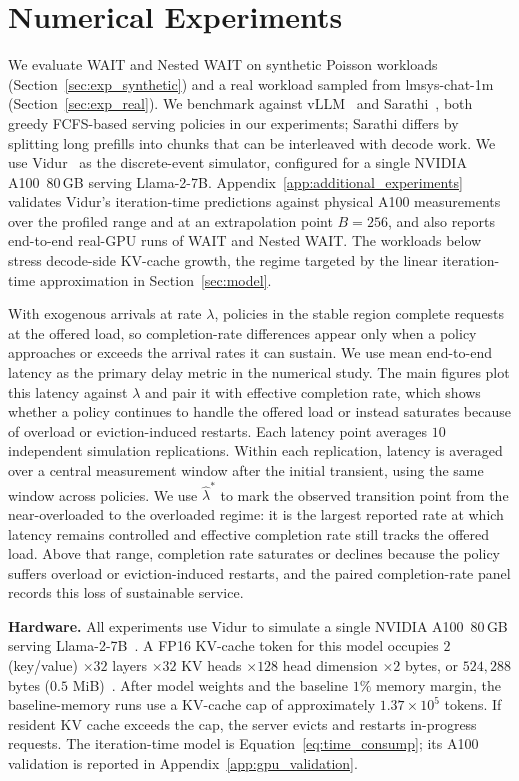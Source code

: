 \section{Numerical Experiments}
\label{sec:experiments}

We evaluate WAIT and Nested WAIT on synthetic Poisson workloads (Section~\ref{sec:exp_synthetic}) and a real workload sampled from lmsys-chat-1m (Section~\ref{sec:exp_real}). We benchmark against vLLM~\citep{kwon2023efficient} and Sarathi~\citep{agrawal2023sarathi}, both greedy FCFS-based serving policies in our experiments; Sarathi differs by splitting long prefills into chunks that can be interleaved with decode work. We use Vidur~\citep{agrawal2024vidur} as the discrete-event simulator, configured for a single NVIDIA A100~80\,GB serving Llama-2-7B. Appendix~\ref{app:additional_experiments} validates Vidur's iteration-time predictions against physical A100 measurements over the profiled range and at an extrapolation point \(B=256\), and also reports end-to-end real-GPU runs of WAIT and Nested WAIT. The workloads below stress decode-side KV-cache growth, the regime targeted by the linear iteration-time approximation in Section~\ref{sec:model}.

With exogenous arrivals at rate $\lambda$, policies in the stable region complete requests at the offered load, so completion-rate differences appear only when a policy approaches or exceeds the arrival rates it can sustain. We use mean end-to-end latency as the primary delay metric in the numerical study. The main figures plot this latency against $\lambda$ and pair it with effective completion rate, which shows whether a policy continues to handle the offered load or instead saturates because of overload or eviction-induced restarts. Each latency point averages $10$ independent simulation replications. Within each replication, latency is averaged over a central measurement window after the initial transient, using the same window across policies. We use $\hat{\lambda}^*$ to mark the observed transition point from the near-overloaded to the overloaded regime: it is the largest reported rate at which latency remains controlled and effective completion rate still tracks the offered load. Above that range, completion rate saturates or declines because the policy suffers overload or eviction-induced restarts, and the paired completion-rate panel records this loss of sustainable service.

\textbf{Hardware.} All experiments use Vidur to simulate a single NVIDIA A100~80\,GB serving Llama-2-7B~\citep{nvidia-a100-specs,huggingface-llama2-docs}. A FP16 KV-cache token for this model occupies \(2\) (key/value) \(\times 32\) layers \(\times 32\) KV heads \(\times 128\) head dimension \(\times 2\) bytes, or \(524{,}288\) bytes (\(0.5\) MiB)~\citep{huggingface-kv-cache-basics}. After model weights and the baseline \(1\%\) memory margin, the baseline-memory runs use a KV-cache cap of approximately \(1.37\times 10^5\) tokens. If resident KV cache exceeds the cap, the server evicts and restarts in-progress requests. The iteration-time model is Equation~\eqref{eq:time_consump}; its A100 validation is reported in Appendix~\ref{app:gpu_validation}.

